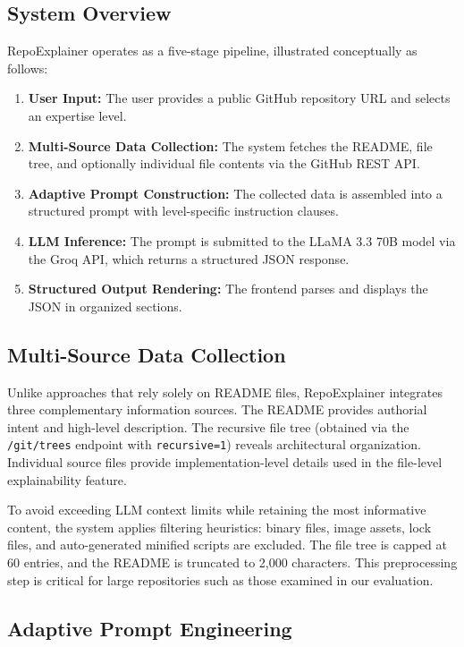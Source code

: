 \documentclass[conference]{IEEEtran}
\begin{document}
\subsection{System Overview}

RepoExplainer operates as a five-stage pipeline, illustrated conceptually as follows:

\begin{enumerate}
    \item \textbf{User Input:} The user provides a public GitHub repository URL and selects an expertise level.
    \item \textbf{Multi-Source Data Collection:} The system fetches the README, file tree, and optionally individual file contents via the GitHub REST API.
    \item \textbf{Adaptive Prompt Construction:} The collected data is assembled into a structured prompt with level-specific instruction clauses.
    \item \textbf{LLM Inference:} The prompt is submitted to the LLaMA 3.3 70B model via the Groq API, which returns a structured JSON response.
    \item \textbf{Structured Output Rendering:} The frontend parses and displays the JSON in organized sections.
\end{enumerate}

\subsection{Multi-Source Data Collection}

Unlike approaches that rely solely on README files, RepoExplainer integrates three complementary information sources. The README provides authorial intent and high-level description. The recursive file tree (obtained via the \texttt{/git/trees} endpoint with \texttt{recursive=1}) reveals architectural organization. Individual source files provide implementation-level details used in the file-level explainability feature.

To avoid exceeding LLM context limits while retaining the most informative content, the system applies filtering heuristics: binary files, image assets, lock files, and auto-generated minified scripts are excluded. The file tree is capped at 60 entries, and the README is truncated to 2,000 characters. This preprocessing step is critical for large repositories such as those examined in our evaluation.

\subsection{Adaptive Prompt Engineering}
\end{document}
